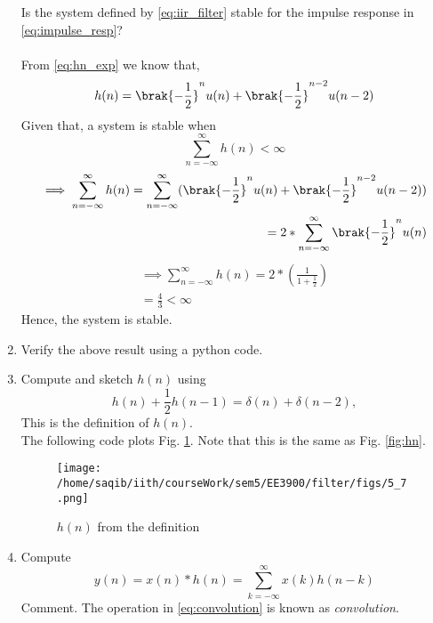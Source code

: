 \documentclass[journal,12pt,twocolumn]{IEEEtran}
\renewcommand\thesection{\arabic{section}}
\begin{document}
\begin{enumerate}[label=\thesection.\arabic*]
Is the system defined by \eqref{eq:iir_filter} stable for the impulse response in \eqref{eq:impulse_resp}?
\\\solution\\
From \eqref{eq:hn_exp} we know that,
\begin{equation}
	h(n) = \brak{-\frac{1}{2}}^{n}u(n) + \brak{-\frac{1}{2}}^{n-2}u(n-2)
\end{equation}
Given that, a system is stable when 
\begin{equation}
	\sum_{n=-\infty}^{\infty}h(n) < \infty
\end{equation}
\begin{align}
	\implies \sum_{n=-\infty}^{\infty}h(n) = \sum_{n=-\infty}^{\infty} (\brak{-\frac{1}{2}}^{n}u(n) + \brak{-\frac{1}{2}}^{n-2}u(n-2))
	\\ = 2*\sum_{n=-\infty}^{\infty} \brak{-\frac{1}{2}}^{n}u(n)
\end{align}
\begin{align}
	\implies \sum_{n=-\infty}^{\infty}h(n) = 2*(\frac{1}{1+\frac{1}{2}})
	\\= \frac{4}{3} < \infty
\end{align}
Hence, the system is stable.
\item Verify the above result using a python code.
\solution\\

\item Compute and sketch $h(n)$ using 
\begin{equation}
\label{eq:iir_filter_h}
h(n) + \frac{1}{2}h(n-1) = \delta(n) + \delta(n-2), 
\end{equation}
%
This is the definition of $h(n)$.
\\
\solution The following code plots Fig. \ref{fig:hndef}. Note that this is the same as Fig. 
\ref{fig:hn}. 
%

\begin{figure}[!ht]
\centering
\texttt{[image: /home/saqib/iith/courseWork/sem5/EE3900/filter/figs/5\_7.png]}
\caption{$h(n)$ from the definition}
\label{fig:hndef}
\end{figure}
%
\item Compute 
%
\begin{equation}
\label{eq:convolution}
y(n) = x(n)*h(n) = \sum_{k=-\infty}^{\infty}x(k)h(n-k)
\end{equation}
%
Comment. The operation in \eqref{eq:convolution} is known as
{\em convolution}.
%
\\

\end{enumerate}
\end{document}
